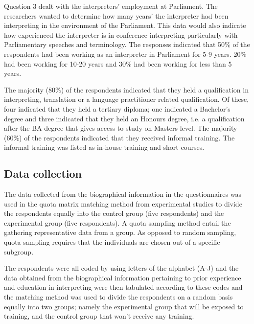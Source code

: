 \documentclass[output=paper]{langsci/langscibook}
\begin{document}
Question 3 dealt with the interpreters’ employment at Parliament. The researchers wanted to determine how many years’ the interpreter had been interpreting in the environment of the Parliament. This data would also indicate how experienced the interpreter is in conference interpreting particularly with Parliamentary speeches and terminology. The responses indicated that 50\% of the respondents had been working as an interpreter in Parliament for 5-9 years. 20\% had been working for 10-20 years and 30\% had been working for less than 5 years. 

The majority (80\%) of the respondents indicated that they held a qualification in interpreting, translation or a language practitioner related qualification. Of these, four indicated that they held a tertiary diploma; one indicated a Bachelor’s degree and three indicated that they held an Honours degree, i.e. a qualification after the BA degree that gives access to study on Masters level. The majority (60\%) of the respondents indicated that they received informal training. The informal training was listed as in-house training and short courses.  


\subsection{Data collection}
The data collected from the biographical information in the questionnaires was used in the quota matrix matching method from experimental studies to divide the respondents equally into the control group (five respondents) and the experimental group (five respondents). A quota sampling method entail the gathering representative data from a group. As opposed to random sampling, quota sampling requires that the individuals are chosen out of a specific subgroup. 

The respondents were all coded by using letters of the alphabet (A-J) and the data obtained from the biographical information pertaining to prior experience and education in interpreting were then tabulated according to these codes and the matching method was used to divide the respondents on a random basis equally into two groups; namely the experimental group that will be exposed to training, and the control group that won’t receive any training. 
\end{document}

